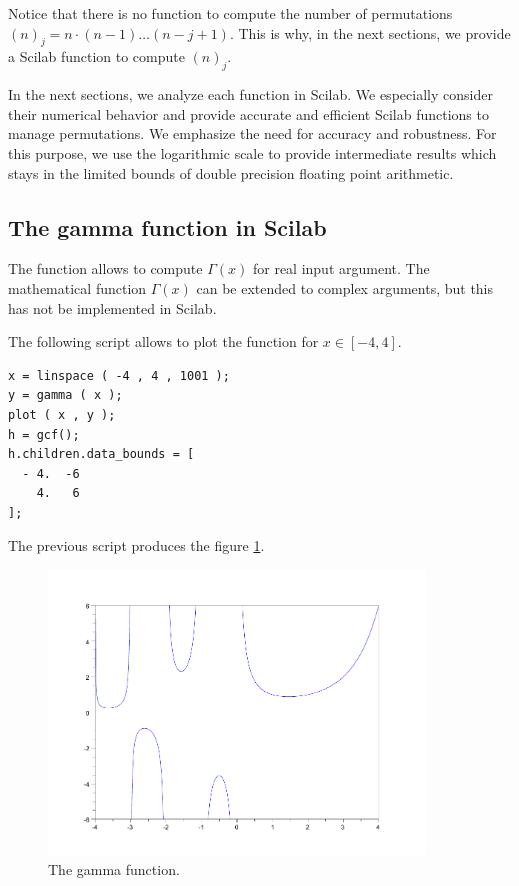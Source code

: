 Notice that there is no function to compute the number of 
permutations $(n)_j=n \cdot (n-1)  \ldots (n-j+1)$. This is why, in the 
next sections, we provide a Scilab function to compute $(n)_j$. 

In the next sections, we analyze each function in Scilab.
We especially consider their numerical behavior and provide 
accurate and efficient Scilab functions to manage permutations.
We emphasize the need for accuracy and robustness. For this purpose, 
we use the logarithmic scale to provide intermediate results which stays in 
the limited bounds of double precision floating point arithmetic.


\subsection{The gamma function in Scilab}

The  function allows to compute $\Gamma(x)$ for 
real input argument. The mathematical function $\Gamma(x)$ can be 
extended to complex arguments, but this has not be implemented 
in Scilab. 

The following script allows to plot the 
function for $x\in[-4,4]$. 
\lstset{language=scilabscript}
\begin{lstlisting}
x = linspace ( -4 , 4 , 1001 );
y = gamma ( x );
plot ( x , y );
h = gcf();
h.children.data_bounds = [
  - 4.  -6
    4.   6
];
\end{lstlisting}
The previous script produces the figure \ref{fig-introstats-gamma}.

\begin{figure}
\begin{center}
\includegraphics[width=10cm]{introdiscreteprobas/gamma_function.pdf}
\end{center}
\caption{The gamma function.}
\label{fig-introstats-gamma}
\end{figure}

